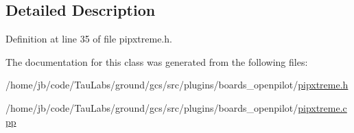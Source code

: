 

\subsection{\-Detailed \-Description}


\-Definition at line 35 of file pipxtreme.\-h.



\-The documentation for this class was generated from the following files\-:\begin{DoxyCompactItemize}
\item 
/home/jb/code/\-Tau\-Labs/ground/gcs/src/plugins/boards\-\_\-openpilot/\hyperlink{pipxtreme_8h}{pipxtreme.\-h}\item 
/home/jb/code/\-Tau\-Labs/ground/gcs/src/plugins/boards\-\_\-openpilot/\hyperlink{pipxtreme_8cpp}{pipxtreme.\-cpp}\end{DoxyCompactItemize}
